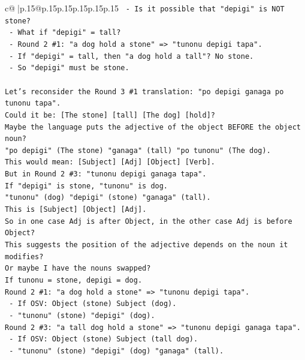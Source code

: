 \documentclass{article}
\begin{document}
{\begin{supertabular}{c@{$\;$}|p{.15\linewidth}@{}p{.15\linewidth}p{.15\linewidth}p{.15\linewidth}p{.15\linewidth}p{.15\linewidth}}
{{{\texttt{  {-} Is it possible that "depigi" is NOT stone?} \\
\texttt{  {-} What if "depigi" = tall?} \\
\texttt{    {-} Round 2 \#1: "a dog hold a stone" => "tunonu depigi tapa".} \\
\texttt{    {-} If "depigi" = tall, then "a dog hold a tall"? No stone.} \\
\texttt{    {-} So "depigi" must be stone.} \\
\\ 
\texttt{Let's reconsider the Round 3 \#1 translation: "po depigi ganaga po tunonu tapa".} \\
\texttt{Could it be: {[}The stone{]} {[}tall{]} {[}The dog{]} {[}hold{]}?} \\
\texttt{Maybe the language puts the adjective of the object BEFORE the object noun?} \\
\texttt{"po depigi" (The stone) "ganaga" (tall) "po tunonu" (The dog).} \\
\texttt{This would mean: {[}Subject{]} {[}Adj{]} {[}Object{]} {[}Verb{]}.} \\
\texttt{But in Round 2 \#3: "tunonu depigi ganaga tapa".} \\
\texttt{If "depigi" is stone, "tunonu" is dog.} \\
\texttt{"tunonu" (dog) "depigi" (stone) "ganaga" (tall).} \\
\texttt{This is {[}Subject{]} {[}Object{]} {[}Adj{]}.} \\
\texttt{So in one case Adj is after Object, in the other case Adj is before Object?} \\
\texttt{This suggests the position of the adjective depends on the noun it modifies?} \\
\texttt{Or maybe I have the nouns swapped?} \\
\texttt{If tunonu = stone, depigi = dog.} \\
\texttt{Round 2 \#1: "a dog hold a stone" => "tunonu depigi tapa".} \\
\texttt{  {-} If OSV: Object (stone) Subject (dog).} \\
\texttt{  {-} "tunonu" (stone) "depigi" (dog).} \\
\texttt{Round 2 \#3: "a tall dog hold a stone" => "tunonu depigi ganaga tapa".} \\
\texttt{  {-} If OSV: Object (stone) Subject (tall dog).} \\
\texttt{  {-} "tunonu" (stone) "depigi" (dog) "ganaga" (tall).} \\
}}}
\end{supertabular}}
\end{document}
